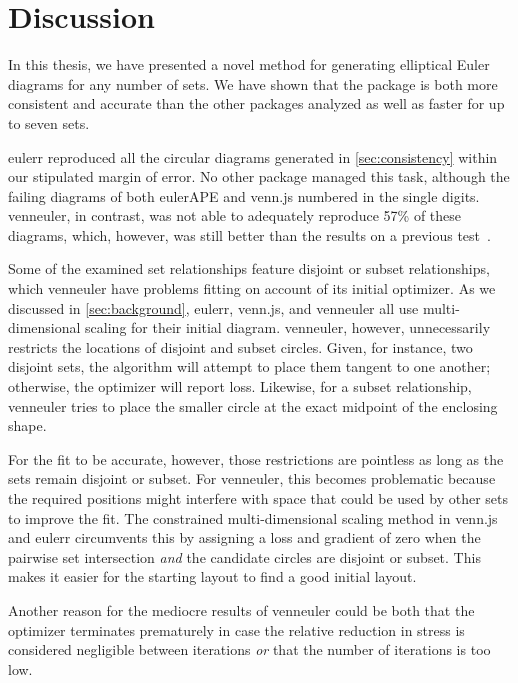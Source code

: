 \documentclass[
  oneside,
  openany,
  numbers=noendperiod,
  parskip=half,
  bibliography=totoc
]{scrbook}\usepackage[]{graphicx}\usepackage{xcolor}
\newcommand{\pkg}[1]{{\fontseries{b}\selectfont #1}}
\begin{document}
\chapter{Discussion}
\label{ch:discussion}

In this thesis, we have presented a novel method for generating elliptical Euler diagrams
for any number of sets. We have shown that the package
is both more consistent and accurate than the other packages analyzed as well as
faster for up to seven sets.

\pkg{eulerr} reproduced all the circular diagrams
generated in \cref{sec:consistency} within our stipulated margin of error.
No other package managed this task, although the failing diagrams of both
\pkg{eulerAPE} and \pkg{venn.js} numbered in the single digits.
\pkg{venneuler}, in contrast, was not able to adequately
reproduce 57\%
of these diagrams, which, however, was still
better than the results on a previous
test~\citep{Frederickson_2015b}.

Some of the examined set relationships feature disjoint or subset
relationships, which \pkg{venneuler} have problems fitting on account of its
initial optimizer. As we discussed in \cref{sec:background},
\pkg{eulerr}, \pkg{venn.js}, and \pkg{venneuler} all use multi-dimensional scaling for
their initial diagram. \pkg{venneuler}, however, unnecessarily restricts the
locations of disjoint and subset circles. Given, for instance, two disjoint
sets, the algorithm will attempt to place them tangent to one another; otherwise,
the optimizer will report loss. Likewise, for a subset
relationship, \pkg{venneuler} tries to place the smaller circle at the exact
midpoint of the enclosing shape.

For the fit to be accurate, however, those restrictions are pointless as long as
the sets remain disjoint or subset.
For \pkg{venneuler}, this becomes problematic because the required positions might interfere
with space that could be used by other sets to improve the fit. The
constrained multi-dimensional scaling method in \pkg{venn.js} and
\pkg{eulerr} circumvents this by
assigning a loss and gradient of zero when the pairwise set intersection
\emph{and} the candidate circles are disjoint or subset. This makes it easier
for the starting layout to find a good initial layout.

Another reason for the mediocre results of \pkg{venneuler} could be both that the optimizer
terminates prematurely in case the relative reduction in stress is considered negligible
between iterations \emph{or} that the number of iterations is too low.
\end{document}
